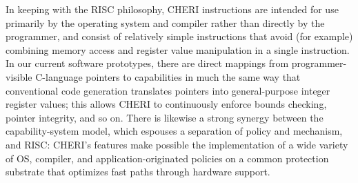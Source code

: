 In keeping with the RISC philosophy, CHERI instructions are intended for use
primarily
by the operating system and compiler rather than directly by the programmer, and consist of relatively simple instructions that avoid (for example) combining memory access and register value manipulation in a single instruction.
In our current software prototypes, there are direct mappings from programmer-visible C-language pointers to capabilities in much the same way that conventional code generation translates pointers into general-purpose integer register values; this allows CHERI to continuously enforce bounds checking, pointer integrity, and so on.
There is likewise a strong synergy between the capability-system
model, which espouses a separation of policy and mechanism, and RISC: CHERI's features make possible
the implementation of a wide variety of OS, compiler, and application-originated policies on a common protection substrate that optimizes fast paths through hardware support.

%
%


